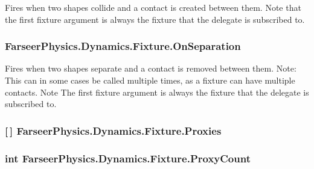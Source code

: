 Fires when two shapes collide and a contact is created between them. Note that the first fixture argument is always the fixture that the delegate is subscribed to. 

\hypertarget{class_farseer_physics_1_1_dynamics_1_1_fixture_aed367fab43f4d3de4b31a9c6c70fe906}{
\subsubsection[{On\+Separation}]{ Farseer\+Physics.\+Dynamics.\+Fixture.\+On\+Separation}}\label{class_farseer_physics_1_1_dynamics_1_1_fixture_aed367fab43f4d3de4b31a9c6c70fe906}


Fires when two shapes separate and a contact is removed between them. Note\+: This can in some cases be called multiple times, as a fixture can have multiple contacts. Note The first fixture argument is always the fixture that the delegate is subscribed to. 

\hypertarget{class_farseer_physics_1_1_dynamics_1_1_fixture_a68821503e6334e4745612402cb1960b0}{
\subsubsection[{Proxies}]{ \mbox{[}$\,$\mbox{]} Farseer\+Physics.\+Dynamics.\+Fixture.\+Proxies}}\label{class_farseer_physics_1_1_dynamics_1_1_fixture_a68821503e6334e4745612402cb1960b0}
\hypertarget{class_farseer_physics_1_1_dynamics_1_1_fixture_af09519aed0c0b3b56239f9ec681ada54}{
\subsubsection[{Proxy\+Count}]{\setlength{\rightskip}{0pt plus 5cm}int Farseer\+Physics.\+Dynamics.\+Fixture.\+Proxy\+Count}}\label{class_farseer_physics_1_1_dynamics_1_1_fixture_af09519aed0c0b3b56239f9ec681ada54}


